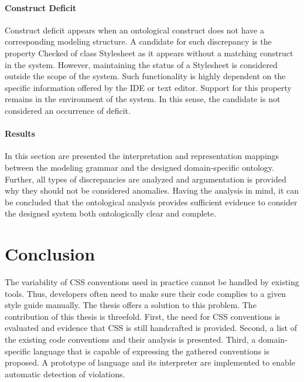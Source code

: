 \documentclass[parskip=full]{uvamscse}
\begin{document}
\subsubsection{Construct Deficit}

Construct deficit appears when an ontological construct does not have a corresponding modeling
structure. A candidate for such discrepancy is the property Checked of class Stylesheet as it
appears without a matching construct in the system. However, maintaining the status of a Stylesheet
is considered outside the scope of the system. Such functionality is highly dependent on the
specific information offered by the IDE or text editor. Support for this property remains in the
environment of the system. In this sense, the candidate is not considered an occurrence of deficit.


\subsubsection{Results}

In this section are presented the interpretation and representation mappings between the modeling
grammar and the designed domain-specific ontology. Further, all types of discrepancies are analyzed
and argumentation is provided why they should not be considered anomalies. Having the analysis in
mind, it can be concluded that the ontological analysis provides sufficient evidence to consider the
designed system both ontologically clear and complete.


\chapter{Conclusion}
\label{sec:conclusion}

The variability of CSS conventions used in practice cannot be handled by existing tools. Thus, developers often need to make sure their code complies to a given style guide manually. The thesis offers a solution to this problem. The contribution of this thesis is threefold. First, the need for CSS conventions is evaluated and
evidence that CSS is still handcrafted is provided. Second, a list of the existing code conventions
and their analysis is presented. Third, a domain-specific language that is capable of expressing the
gathered conventions is proposed. A prototype of language and its interpreter are implemented to
enable automatic detection of violations.

{%


}
\end{document}
